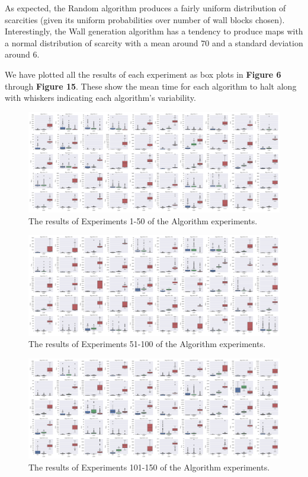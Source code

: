 \documentclass[12pt]{article}
\begin{document}
As expected, the Random algorithm produces a fairly uniform distribution of scarcities (given its uniform probabilities over number of wall blocks chosen). Interestingly, the Wall generation algorithm has a tendency to produce maps with a normal distribution of scarcity with a mean around $ 70 $ and a standard deviation around $ 6 $.

We have plotted all the results of each experiment as box plots in \textbf{Figure 6} through \textbf{Figure 15}. These show the mean time for each algorithm to halt along with whiskers indicating each algorithm's variability.

\begin{figure}[htbp]
\includegraphics[width=1\linewidth]{Algorithm0-49.png} 
\caption{The results of Experiments 1-50 of the Algorithm experiments.}
\end{figure} 

\begin{figure}[htbp]
\includegraphics[width=1\linewidth]{Algorithm50-99.png} 
\caption{The results of Experiments 51-100 of the Algorithm experiments.}
\end{figure} 

\begin{figure}[htbp]
\includegraphics[width=1\linewidth]{Algorithm100-149.png} 
\caption{The results of Experiments 101-150 of the Algorithm experiments.}
\end{figure} 
\end{document}
